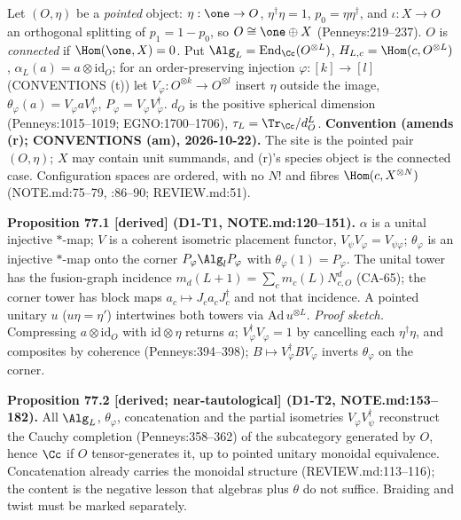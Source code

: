 Let \((O,\eta)\) be a \emph{pointed} object: \(\eta:\one\to O\),
\(\eta^\dagger\eta=1\), \(p_0=\eta\eta^\dagger\), and \(\iota:X\to O\) an
orthogonal splitting of \(p_1=1-p_0\), so \(O\cong\one\oplus X\) (Penneys:219--237).
\(O\) is \emph{connected} if \(\Hom(\one,X)=0\).  Put
\(\Alg_L=\operatorname{End}_\Cc(O^{\otimes L})\), \(H_{L,c}=\Hom(c,O^{\otimes L})\),
\(\alpha_L(a)=a\otimes\mathrm{id}_O\); for an order-preserving injection
\(\varphi:[k]\to[l]\) (CONVENTIONS (t)) let \(V_\varphi:O^{\otimes k}\to O^{\otimes l}\)
insert \(\eta\) outside the image, \(\theta_\varphi(a)=V_\varphi aV_\varphi^\dagger\),
\(P_\varphi=V_\varphi V_\varphi^\dagger\).  \(d_O\) is the positive spherical
dimension (Penneys:1015--1019; EGNO:1700--1706), \(\tau_L=\Tr_\Cc/d_O^{L}\).
\textbf{Convention (amends (r); CONVENTIONS (am), 2026-10-22).}  The site is
the pointed pair \((O,\eta)\); \(X\) may contain unit summands, and (r)'s
species object is the connected case.  Configuration spaces are ordered, with
no \(N!\) and fibres \(\Hom(c,X^{\otimes N})\) (NOTE.md:75--79, :86--90; REVIEW.md:51).

\textbf{Proposition 77.1 [derived] (D1-T1, NOTE.md:120--151).}  \(\alpha\) is
a unital injective \(*\)-map; \(V\) is a coherent isometric placement functor,
\(V_\psi V_\varphi=V_{\psi\varphi}\); \(\theta_\varphi\) is an injective
\(*\)-map onto the corner \(P_\varphi\Alg_lP_\varphi\) with
\(\theta_\varphi(1)=P_\varphi\).  The unital tower has the fusion-graph
incidence \(m_d(L{+}1)=\sum_cm_c(L)N^d_{c,O}\) (CA-65); the corner tower has
block maps \(a_c\mapsto J_ca_cJ_c^\dagger\) and not that incidence.  A pointed
unitary \(u\) (\(u\eta=\eta'\)) intertwines both towers via \(\mathrm{Ad}\,u^{\otimes L}\).
\emph{Proof sketch.}  Compressing \(a\otimes\mathrm{id}_O\) with
\(\mathrm{id}\otimes\eta\) returns \(a\); \(V_\varphi^\dagger V_\varphi=1\) by
cancelling each \(\eta^\dagger\eta\), and composites by coherence
(Penneys:394--398); \(B\mapsto V_\varphi^\dagger BV_\varphi\) inverts \(\theta_\varphi\) on the corner.

\textbf{Proposition 77.2 [derived; near-tautological] (D1-T2, NOTE.md:153--182).}
All \(\Alg_L\), \(\theta_\varphi\), concatenation and the partial isometries
\(V_\varphi V_\psi^\dagger\) reconstruct the Cauchy completion (Penneys:358--362) of the
subcategory generated by \(O\), hence \(\Cc\) if \(O\) tensor-generates it, up to pointed
unitary monoidal equivalence.  Concatenation already carries the monoidal structure
(REVIEW.md:113--116); the content is the negative lesson that algebras plus \(\theta\)
do not suffice.  Braiding and twist must be marked separately.

